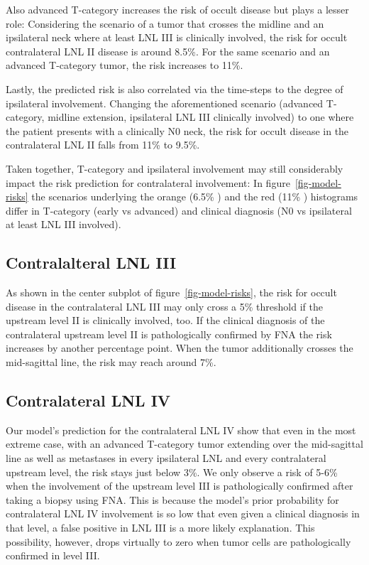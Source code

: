 \documentclass[
  sn-mathphys-num,
]{sn-jnl}
\begin{document}
Also advanced T-category increases the risk of occult disease but plays
a lesser role: Considering the scenario of a tumor that crosses the
midline and an ipsilateral neck where at least LNL III is clinically
involved, the risk for occult contralateral LNL II disease is around
8.5\%. For the same scenario and an advanced T-category tumor, the risk
increases to 11\%.

Lastly, the predicted risk is also correlated via the time-steps to the
degree of ipsilateral involvement. Changing the aforementioned scenario
(advanced T-category, midline extension, ipsilateral LNL III clinically
involved) to one where the patient presents with a clinically N0 neck,
the risk for occult disease in the contralateral LNL II falls from 11\%
to 9.5\%.

Taken together, T-category and ipsilateral involvement may still
considerably impact the risk prediction for contralateral involvement:
In figure~\ref{fig-model-risks} the scenarios underlying the orange
(6.5\% ) and the red (11\% ) histograms differ in T-category (early vs
advanced) and clinical diagnosis (N0 vs ipsilateral at least LNL III
involved).

\subsection{Contralalteral LNL III}\label{contralalteral-lnl-iii}

As shown in the center subplot of figure~\ref{fig-model-risks}, the risk
for occult disease in the contralateral LNL III may only cross a 5\%
threshold if the upstream level II is clinically involved, too. If the
clinical diagnosis of the contralateral upstream level II is
pathologically confirmed by FNA the risk increases by another percentage
point. When the tumor additionally crosses the mid-sagittal line, the
risk may reach around 7\%.

\subsection{Contralateral LNL IV}\label{contralateral-lnl-iv}

Our model's prediction for the contralateral LNL IV show that even in
the most extreme case, with an advanced T-category tumor extending over
the mid-sagittal line as well as metastases in every ipsilateral LNL and
every contralateral upstream level, the risk stays just below 3\%. We
only observe a risk of 5-6\% when the involvement of the upstream level
III is pathologically confirmed after taking a biopsy using FNA. This is
because the model's prior probability for contralateral LNL IV
involvement is so low that even given a clinical diagnosis in that
level, a false positive in LNL III is a more likely explanation. This
possibility, however, drops virtually to zero when tumor cells are
pathologically confirmed in level III.
\end{document}
